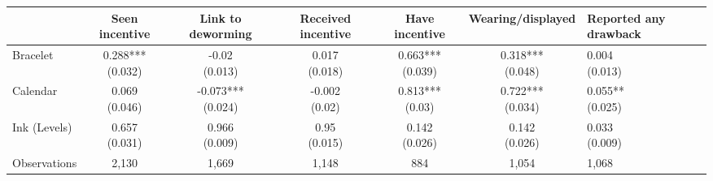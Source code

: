


\centering
\begin{tabular}[t]{lcccccl}
\toprule
 & Seen incentive & Link to deworming & Received incentive & Have incentive & Wearing/displayed & Reported any drawback\\
\midrule
Bracelet & \makecell[c]{0.288***\\(0.032)} & \makecell[c]{-0.02\\(0.013)} & \makecell[c]{0.017\\(0.018)} & \makecell[c]{0.663***\\(0.039)} & \makecell[c]{0.318***\\(0.048)} & \makecell[c]{0.004\\(0.013)}\\
Calendar & \makecell[c]{0.069\\(0.046)} & \makecell[c]{-0.073***\\(0.024)} & \makecell[c]{-0.002\\(0.02)} & \makecell[c]{0.813***\\(0.03)} & \makecell[c]{0.722***\\(0.034)} & \makecell[c]{0.055**\\(0.025)}\\
\midrule
Ink (Levels) & \makecell[c]{0.657\\(0.031)} & \makecell[c]{0.966\\(0.009)} & \makecell[c]{0.95\\(0.015)} & \makecell[c]{0.142\\(0.026)} & \makecell[c]{0.142\\(0.026)} & \makecell[c]{0.033\\(0.009)}\\
Observations & 2,130 & 1,669 & 1,148 & 884 & 1,054 & 1,068\\
\bottomrule
\end{tabular}

